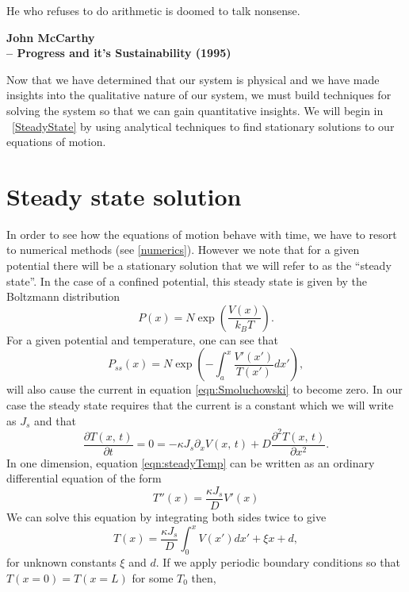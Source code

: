 \epigraph{He who refuses to do arithmetic is doomed to talk nonsense.}{\textbf{John McCarthy \\ -- Progress and it's Sustainability (1995)}}
Now that we have determined that our system is physical and we have made insights into the qualitative nature of our system, we must build techniques for solving the system so that we can gain quantitative insights. We will begin in ~\autoref{SteadyState} by using analytical techniques to find stationary solutions to our equations of motion.
\section{Steady state solution} \label{SteadyState}
In order to see how the equations of motion behave with time, we have to resort to numerical methods (see \autoref{numerics}). However we note that for a given potential there will be a stationary solution that we will refer to as the ``steady state''. In the case of a confined potential, this steady state is given by the Boltzmann distribution
\begin{equation}
P(x) = N \exp(\frac{V(x)}{k_B T}).
\end{equation}
For a given potential and temperature, one can see that
\begin{equation}
P_{ss}(x) = N \exp{\left(-\int_a^x \frac{V'(x')}{T(x')} dx' \right)},
\end{equation}
will also cause the current in equation \ref{eqn:Smoluchowski} to become zero. In our case the steady state requires that the current is a constant which we will write as $J_s$ and that
\begin{equation}
\frac{\partial T(x, \, t)}{\partial t} = 0 = -\kappa J_s \partial_x V(x, \, t) + D \frac{\partial^2 T(x, \, t)}{\partial x^2}. \label{eqn:steadyTemp}
\end{equation}
In one dimension, equation \ref{eqn:steadyTemp} can be written as an ordinary differential equation of the form
\begin{equation}
T''(x) = \frac{\kappa J_s}{D} V'(x)
\end{equation}
We can solve this equation by integrating both sides twice to give
\begin{equation}
T(x) = \frac{\kappa J_s}{D} \int_0^x V(x') dx' + \xi x + d, \label{eqn:steadyTemperature}
\end{equation}
for unknown constants $\xi$ and $d$. If we apply periodic boundary conditions so that $T(x = 0) = T(x = L)$ for some $T_0$ then,
